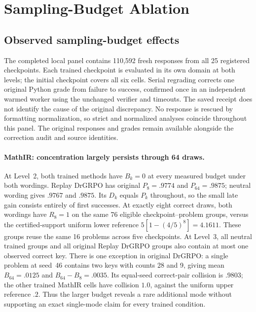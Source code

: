 \documentclass{article}
\newcommand{\1}{\mathbf 1}
\theoremstyle{remark}
\theoremstyle{definition}
\theoremstyle{plain}
\begin{document}
\clearpage
\section{Sampling-Budget Ablation}
\label{app:sampling-budget-ablation}



\subsection{Observed sampling-budget effects}

The completed local panel contains 110,592 fresh responses from all 25
registered checkpoints. Each trained checkpoint is evaluated in its own domain
at both levels; the initial checkpoint covers all six cells. Serial regrading
corrects one original Python grade from failure to success, confirmed once
in an independent warmed worker using the unchanged verifier and timeouts.
The saved receipt does not identify the cause of the original discrepancy.
No response is rescued by formatting normalization, so strict and normalized
analyses coincide throughout this panel. The original responses and grades
remain available alongside the correction audit and source identities.

\paragraph{MathIR: concentration largely persists through 64 draws.}
At Level~2, both trained methods have $B_k=0$ at every measured budget under
both wordings. Replay DrGRPO has original $P_8=.9774$ and $P_{64}=.9875$;
neutral wording gives $.9767$ and $.9875$. Its $D_k$ equals $P_k$ throughout,
so the small late gain consists entirely of first successes. At exactly eight
correct draws, both wordings have $R_8=1$ on the same 76 eligible
checkpoint--problem groups, versus the certified-support uniform lower
reference $5[1-(4/5)^8]=4.1611$. These groups reuse the same 16 problems
across five checkpoints. At Level~3, all neutral trained groups and all
original Replay DrGRPO groups also contain at most one observed correct key.
There is one exception in original DrGRPO: a single problem at seed~46
contains two keys with counts 28 and 9, giving mean $B_{64}=.0125$ and
$B_{64}-B_8=.0035$. Its equal-seed correct-pair collision is $.9803$;
the other trained MathIR cells have collision $1.0$, against the uniform
upper reference $.2$. Thus the larger budget reveals a rare additional mode
without supporting an exact single-mode claim for every trained condition.
\end{document}
